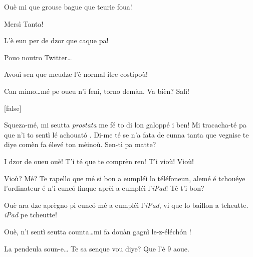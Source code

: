 \begin{drama}
\Tanteunspeaks Ouè mi que grouse bague que teurie foua!

\Alicespeaks{} Mersì Tanta!

\Tantaspeaks{} L'è eun per de dzor que caque pa!

\Alicespeaks Pouo noutro Twitter\ldots

\Tanteunspeaks{} Avouì sen que meudze l'è normal itre costipoù!

\Tantaspeaks Can mimo\ldots mé pe oueu n'i fenì, torno demàn. Va bièn? Salì!

[false]%



{}



\Vioupspeaks Squeza-m\'e, mi seutta \textit{prostata} me fé to di lon galoppé i ben! Mi tracacha-t\'e pa que n'i to sentì lé achouat\'o .  Di-me té se n'a fata de eunna tanta que vegnise te diye comèn fa élevé ton mèinoù. Sen-tì pa matte?

\Vioujspeaks I dzor de oueu ouè! T'i té que te comprèn ren! T'i  vioù! Vioù!

\Vioupspeaks{} Vioù? Mé? Te rapello que mé si bon a eumpl\'eì lo téléfoneun, alemé é tchouéye l'ordinateur é n'i eunc\'o finque aprèi a eumpl\'eì l'\textit{iPad}! Té t'i bon?

\Vioujspeaks Ouè ara dze aprègno pi eunc\'o mé a eumpl\'eì l'\textit{iPad}, vi que lo baillon a tcheutte. \textit{iPad} pe tcheutte!

\Vioupspeaks Ouè, n'i sentì seutta counta\ldots mi fa douàn gagnì le-z-é\-lé\-ch\'on !


\vspace*{-7pt}
\vspace*{-5pt}

\Vioupspeaks La pendeula soun-e\ldots {} Te sa senque vou diye? Que l'è 9 aoue.


\end{drama}
